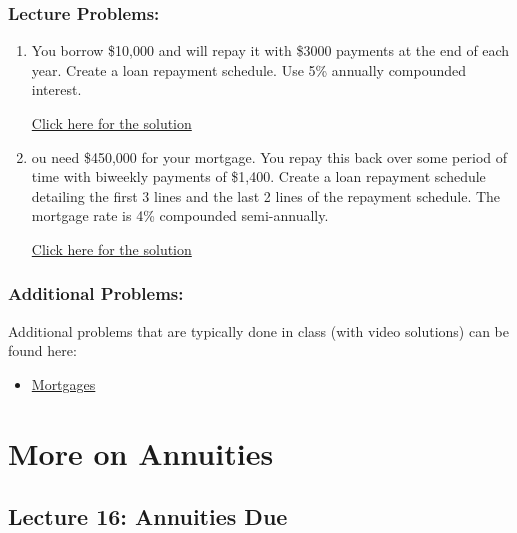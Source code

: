 \documentclass[
]{book}
\providecommand{\tightlist}{%
  \setlength{\itemsep}{0pt}\setlength{\parskip}{0pt}}
\begin{document}
\subsection*{Lecture Problems:}\label{lecture-problems-15}

\begin{enumerate}
\def\labelenumi{\arabic{enumi}.}
\tightlist
\item
  You borrow \$10,000 and will repay it with \$3000 payments at the end of each year. Create a loan repayment schedule. Use 5\% annually compounded interest.

  \href{https://youtu.be/k9lk4D2iPtc}{Click here for the solution}
\item
  ou need \$450,000 for your mortgage. You repay this back over some period of time with biweekly payments of \$1,400. Create a loan repayment schedule detailing the first 3 lines and the last 2 lines of the repayment schedule. The mortgage rate is 4\% compounded semi-annually.

  \href{https://youtu.be/LuDq5KVlKeg}{Click here for the solution}
\end{enumerate}

\subsection*{Additional Problems:}\label{additional-problems-15}

Additional problems that are typically done in class (with video solutions) can be found here:

\begin{itemize}
\tightlist
\item
  \href{https://theelementsmath.github.io/M114/mortgages.html\#mortgage-fundamentals}{Mortgages}
\end{itemize}

\chapter{More on Annuities}\label{more-on-annuities}

\section*{Lecture 16: Annuities Due}\label{lecture-16-annuities-due}
\end{document}
